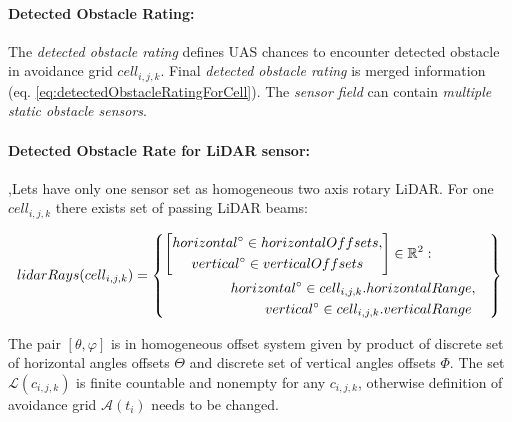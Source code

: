 \setcounter{chapter}{6}
\setcounter{section}{7}
\setcounter{subsection}{3}

\paragraph{Detected Obstacle Rating:} The \emph{detected obstacle rating} defines UAS chances to encounter detected obstacle in avoidance grid $cell_{i,j,k}$. Final \emph{detected obstacle rating} is merged information (eq. \ref{eq:detectedObstacleRatingForCell}). The \emph{sensor field} can contain \emph{multiple} \emph{static obstacle sensors}.

\paragraph{Detected Obstacle Rate for LiDAR sensor:},Lets have only one sensor set as homogeneous two axis rotary LiDAR. For one $cell_{i,j,k}$ there exists set of passing LiDAR beams:

\begin{equation}
    lidar Rays(cell_{i,j,k})=
    \left\{
        \begin{aligned}
        \left[
            \begin{gathered}
                horizontal^\circ\in horizontal Offsets,\\
                vertical^\circ\in vertical Offsets
            \end{gathered}
        \right]\in\mathbb{R}^2:&\\
        horizontal^\circ\in cell_{i,j,k}.horizontal &Range,\\
        vertical^\circ\in cell_{i,j,k}.vertical &Range\\
        \end{aligned}
    \right\}
\end{equation}

\noindent The pair $[\theta,\varphi]$ is in homogeneous offset system given by product of discrete set of horizontal angles offsets $\Theta$ and discrete set of vertical angles offsets $\Phi$. The set $\mathscr{L}(c_{i,j,k})$ is finite countable and nonempty for any $c_{i,j,k}$, otherwise definition of avoidance grid $\mathscr{A}(t_i)$ needs to be changed.

